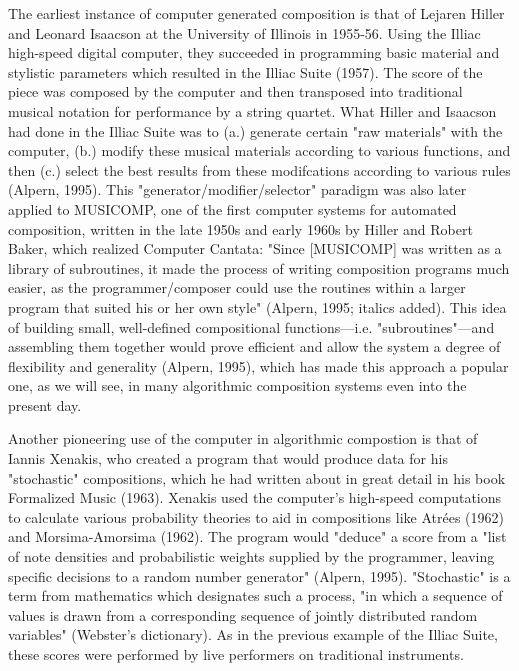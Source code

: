 \documentclass{automatextcc}
\begin{document}
The earliest instance of computer generated composition is that of Lejaren Hiller and Leonard Isaacson at the University of Illinois in 1955-56. Using the Illiac high-speed digital computer, they succeeded in programming basic material and stylistic parameters which resulted in the Illiac Suite (1957). The score of the piece was composed by the computer and then transposed into traditional musical notation for performance by a string quartet. What Hiller and Isaacson had done in the Illiac Suite was to (a.) generate certain "raw materials" with the computer, (b.) modify these musical materials according to various functions, and then (c.) select the best results from these modifcations according to various rules (Alpern, 1995). This "generator/modifier/selector" paradigm was also later applied to MUSICOMP, one of the first computer systems for automated composition, written in the late 1950s and early 1960s by Hiller and Robert Baker, which realized Computer Cantata: "Since [MUSICOMP] was written as a library of subroutines, it made the process of writing composition programs much easier, as the programmer/composer could use the routines within a larger program that suited his or her own style" (Alpern, 1995; italics added). This idea of building small, well-defined compositional functions—i.e. "subroutines"—and assembling them together would prove efficient and allow the system a degree of flexibility and generality (Alpern, 1995), which has made this approach a popular one, as we will see, in many algorithmic composition systems even into the present day.

Another pioneering use of the computer in algorithmic compostion is that of Iannis Xenakis, who created a program that would produce data for his "stochastic" compositions, which he had written about in great detail in his book Formalized Music (1963). Xenakis used the computer's high-speed computations to calculate various probability theories to aid in compositions like Atrées (1962) and Morsima-Amorsima (1962). The program would "deduce" a score from a "list of note densities and probabilistic weights supplied by the programmer, leaving specific decisions to a random number generator" (Alpern, 1995). "Stochastic" is a term from mathematics which designates such a process, "in which a sequence of values is drawn from a corresponding sequence of jointly distributed random variables" (Webster's dictionary). As in the previous example of the Illiac Suite, these scores were performed by live performers on traditional instruments.
\end{document}
